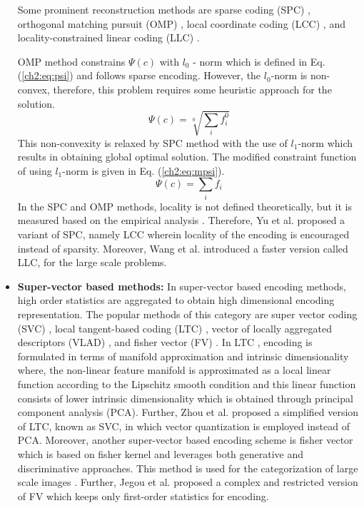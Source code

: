 \begin{itemize}
Some prominent reconstruction methods  are sparse coding (SPC) \cite{Yang2009}, orthogonal matching pursuit (OMP) \cite{Tropp2007}, local coordinate coding (LCC) \cite{Yu2009}, and locality-constrained linear coding (LLC) \cite{Wang2010}. 

OMP method constrains $\Psi(c)$ with $l_0$ - norm \cite{Bruckstein2009} which is defined in Eq. (\ref{ch2:eq:psi}) and follows sparse encoding. However, the $l_0$-norm is non-convex, therefore, this problem requires some heuristic approach for the solution. 
\begin{equation}\label{ch2:eq:psi}
\Psi(c)=  \sqrt[0]{\sum_i f_i^0}
\end{equation}
This non-convexity is relaxed by SPC method with the use of $l_1$-norm \cite{lee2007efficient} which results in obtaining global optimal solution. The modified constraint function of using  $l_1$-norm is given in Eq. (\ref{ch2:eq:mpsi}).
\begin{equation}\label{ch2:eq:mpsi}
\Psi(c)=  \sum_i f_i
\end{equation}
In the SPC and OMP methods, locality is not defined theoretically, but it is measured based on the empirical analysis \cite{Yu2009}. Therefore, Yu et al. \cite{Yu2009} proposed a variant of SPC, namely LCC wherein locality of the encoding is encouraged instead of sparsity. Moreover,  Wang et al. \cite{Wang2010} introduced a faster version called LLC, for the large scale problems.

\item \textbf{Super-vector based methods:}  
In super-vector based encoding methods, high order statistics are aggregated to obtain high dimensional encoding representation. The popular methods of this category are super vector coding (SVC) \cite{Zhou2010}, local tangent-based coding (LTC) \cite{Yu2010}, vector of locally aggregated descriptors (VLAD) \cite{Jegou_2012}, and fisher vector (FV) \cite{Perronnin2010}.  
In LTC \cite{Yu2010}, encoding is formulated in terms of manifold approximation and intrinsic dimensionality where, the non-linear feature manifold is approximated as a local linear function according to the Lipschitz smooth condition and this linear function consists of lower intrinsic dimensionality which is obtained through principal component analysis (PCA). Further,  Zhou et al. \cite{Zhou2010} proposed a simplified version of LTC, known as  SVC, in which vector quantization is employed instead of PCA. Moreover, another super-vector based encoding scheme is fisher vector which is based on fisher kernel \cite{jaakkola1999exploiting} and leverages both generative and discriminative approaches. This method is used for the categorization of large scale images \cite{Perronnin2010}. Further,  Jegou et al. \cite{Jegou_2012} proposed a complex and restricted version of FV which keeps only first-order statistics for encoding. 


\end{itemize}
